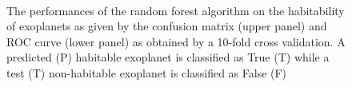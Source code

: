 \documentclass[
12pt, %
a4paper, %
oneside, %
headinclude,footinclude, %
BCOR5mm, %
]{scrartcl}
\begin{document}
\begin{figure}[h]
  \centering
{}\\
\caption{The performances of the random forest algorithm on the habitability of exoplanets as given by the confusion matrix (upper panel) and ROC curve (lower panel) as obtained by a 10-fold cross validation. A predicted (P) habitable exoplanet is classified as True (T) while a test (T) non-habitable exoplanet is classified as False (F)}
\label{Random_forest_tree_results}
\end{figure} 

\clearpage 
\end{document}
